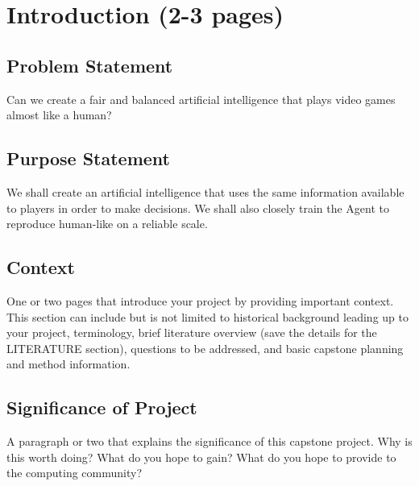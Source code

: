 \chapter{Introduction (2-3 pages)}


\section{Problem Statement} 

Can we create a fair and balanced artificial intelligence that plays video games almost like a human?





\section{Purpose Statement} 

We shall create an artificial intelligence that uses the same information available to players in order to make decisions. We shall also closely train the Agent to reproduce human-like on a reliable scale. 





\section{Context} 

One or two pages that introduce your project by providing important context. This section can include but is not limited to historical background leading up to your project, terminology, brief literature overview (save the details for the LITERATURE section), questions to be addressed, and basic capstone planning and method information. 




\section{Significance of Project} 

A paragraph or two that explains the significance of this capstone project. Why is this worth doing? What do you hope to gain? What do you hope to provide to the computing community?

